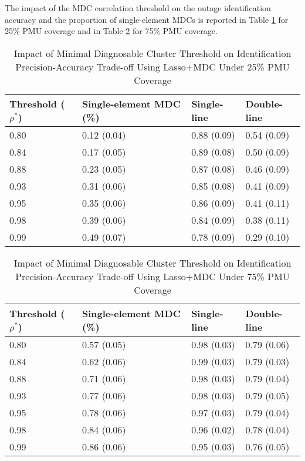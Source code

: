 The impact of the MDC correlation threshold on the outage identification accuracy and the proportion of single-element MDCs is reported in Table \ref{ch5:tab:impact_mdc_threshold_10pmus} for 25\% PMU coverage and in Table \ref{ch5:tab:impact_mdc_threshold_29pmus} for 75\% PMU coverage. 
\begin{table}[!th]
\caption{Impact of Minimal Diagnosable Cluster Threshold on Identification Precision-Accuracy Trade-off Using Lasso+MDC Under 25\% PMU Coverage}
\label{ch5:tab:impact_mdc_threshold_10pmus}
\centering
\begin{tabular}{llll}
\hline
\hline
Threshold ($\rho^*$)  & Single-element MDC (\%) & Single-line & Double-line \\
\hline
0.80 & 0.12 (0.04) & 0.88 (0.09) & 0.54 (0.09) \\
0.84 & 0.17 (0.05) & 0.89 (0.08) & 0.50 (0.09) \\
0.88 & 0.23 (0.05) & 0.87 (0.08) & 0.46 (0.09) \\
0.93 & 0.31 (0.06) & 0.85 (0.08) & 0.41 (0.09) \\
0.95 & 0.35 (0.06) & 0.86 (0.09) & 0.41 (0.11) \\
0.98 & 0.39 (0.06) & 0.84 (0.09) & 0.38 (0.11) \\
0.99 & 0.49 (0.07) & 0.78 (0.09) & 0.29 (0.10) \\
\hline 
\end{tabular}
\end{table}

\begin{table}[!th]
\caption{Impact of Minimal Diagnosable Cluster Threshold on Identification Precision-Accuracy Trade-off Using Lasso+MDC Under 75\% PMU Coverage}
\label{ch5:tab:impact_mdc_threshold_29pmus}
\centering
\begin{tabular}{llll}
\hline
\hline
Threshold ($\rho^*$)  & Single-element MDC (\%) & Single-line & Double-line \\
\hline
0.80 & 0.57 (0.05) & 0.98 (0.03) & 0.79 (0.06) \\
0.84 & 0.62 (0.06) & 0.99 (0.03) & 0.79 (0.03) \\
0.88 & 0.71 (0.06) & 0.98 (0.03) & 0.79 (0.04) \\
0.93 & 0.77 (0.06) & 0.98 (0.03) & 0.79 (0.05) \\
0.95 & 0.78 (0.06) & 0.97 (0.03) & 0.79 (0.04) \\
0.98 & 0.84 (0.06) & 0.96 (0.02) & 0.78 (0.04) \\
0.99 & 0.86 (0.06) & 0.95 (0.03) & 0.76 (0.05) \\
\hline 
\end{tabular}
\end{table}

